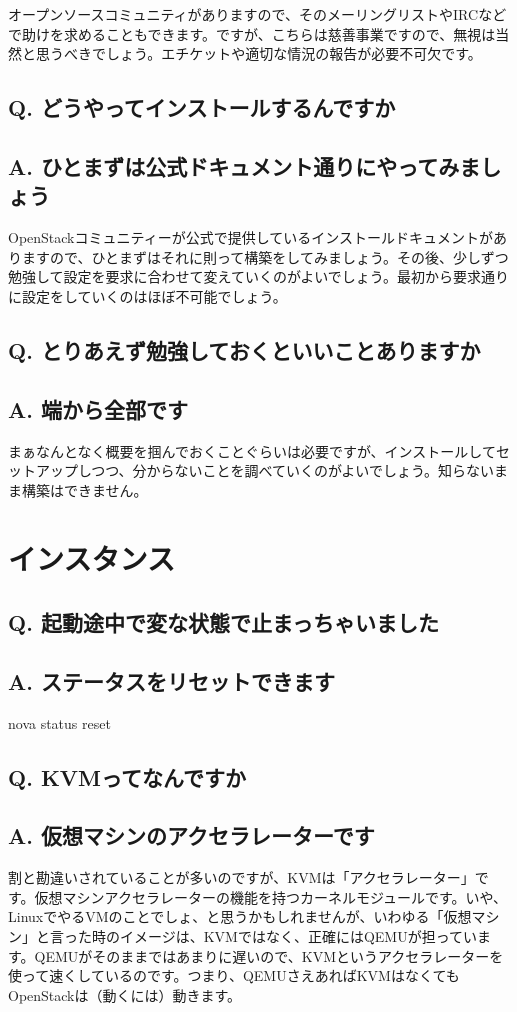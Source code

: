 \documentclass[9pt,b5paper,tombo,openany]{jsbook}
\begin{document}
オープンソースコミュニティがありますので、そのメーリングリストやIRCなどで助けを求めることもできます。ですが、こちらは慈善事業ですので、無視は当然と思うべきでしょう。エチケットや適切な情況の報告が必要不可欠です。
\subsection*{Q. どうやってインストールするんですか}
\subsection*{A. ひとまずは公式ドキュメント通りにやってみましょう}
OpenStackコミュニティーが公式で提供しているインストールドキュメントがありますので、ひとまずはそれに則って構築をしてみましょう。その後、少しずつ勉強して設定を要求に合わせて変えていくのがよいでしょう。最初から要求通りに設定をしていくのはほぼ不可能でしょう。

\subsection*{Q. とりあえず勉強しておくといいことありますか}
\subsection*{A. 端から全部です}
まぁなんとなく概要を掴んでおくことぐらいは必要ですが、インストールしてセットアップしつつ、分からないことを調べていくのがよいでしょう。知らないまま構築はできません。

\section{インスタンス}

\subsection*{Q. 起動途中で変な状態で止まっちゃいました}
\subsection*{A. ステータスをリセットできます}
nova status reset

\subsection*{Q. KVMってなんですか}
\subsection*{A. 仮想マシンのアクセラレーターです}
割と勘違いされていることが多いのですが、KVMは「アクセラレーター」です。仮想マシンアクセラレーターの機能を持つカーネルモジュールです。いや、LinuxでやるVMのことでしょ、と思うかもしれませんが、いわゆる「仮想マシン」と言った時のイメージは、KVMではなく、正確にはQEMUが担っています。QEMUがそのままではあまりに遅いので、KVMというアクセラレーターを使って速くしているのです。つまり、QEMUさえあればKVMはなくてもOpenStackは（動くには）動きます。
\end{document}
